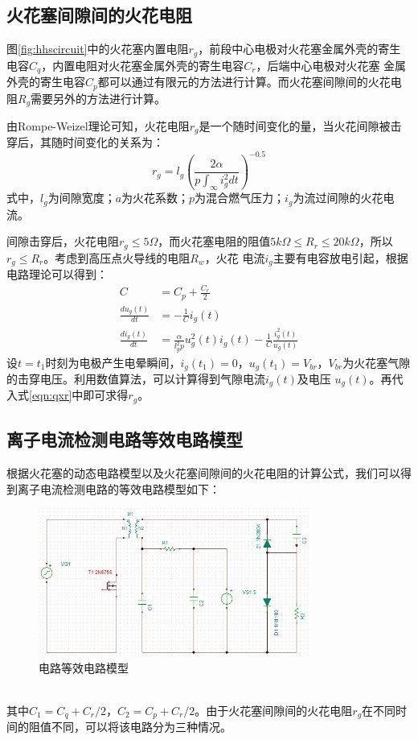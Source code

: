 \subsection{火花塞间隙间的火花电阻}
图\ref{fig:hhscircuit}中的火花塞内置电阻$r_{g}$，前段中心电极对火花塞金属外壳的寄生电容$C_{q}$，内置电阻对火花塞金属外壳的寄生电容$C_{r}$，后端中心电极对火花塞
金属外壳的寄生电容$C_{p}$都可以通过有限元的方法进行计算\cite{zyl2011}。而火花塞间隙间的火花电阻$R_{g}$需要另外的方法进行计算。
\par 由Rompe-Weizel理论可知，火花电阻$r_{g}$是一个随时间变化的量，当火花间隙被击穿后，其随时间变化的关系为：
\begin{equation}
	\label{eqn:qxr}
	r_{g}=l_{g}(\frac{2\alpha}{p\int_{\infty}i_{g}^{2}dt})^{-0.5}
\end{equation}
式中，$l_{g}$为间隙宽度；$a$为火花系数；$p$为混合燃气压力；$i_{g}$为流过间隙的火花电流。
\par 间隙击穿后，火花电阻$r_{g}\leq5\Omega$，而火花塞电阻的阻值$5k\Omega\leq R_{r}\leq 20k\Omega$，所以$r_{g}\leq R_{r}$。考虑到高压点火导线的电阻$R_{w}$，火花
电流$i_{g}$主要有电容放电引起，根据电路理论可以得到：
\begin{align}
C &= C_{p}+\frac{C_{r}}{2}\\
\frac{du_{g}(t)}{dt}&=-\frac{1}{C}i_{g}(t)\\
\frac{di_{g}(t)}{dt}&=\frac{\alpha}{l_{g}^{2}p}u_{g}^{2}(t)i_{g}(t)-\frac{1}{C}\frac{i_{g}^{2}(t)}{u_{g}(t)}
\end{align}
设$t=t_{1}$时刻为电极产生电晕瞬间，$i_{g}(t_{1})=0$，$u_{g}(t_{1})=V_{br}$，$V_{br}$为火花塞气隙的击穿电压。利用数值算法，可以计算得到气隙电流$i_{g}(t)$及电压
$u_{g}(t)$。再代入式\ref{eqn:qxr}中即可求得$r_{g}$。
\subsection{离子电流检测电路等效电路模型}
根据火花塞的动态电路模型以及火花塞间隙间的火花电阻的计算公式，我们可以得到离子电流检测电路的等效电路模型如下：
\begin{figure}[!h]
	\centering
	\includegraphics[width=0.8\textwidth]{thesis_figure/cmp_circuit}
	\caption{电路等效电路模型}
	\label{fig:cmp_circuit}
\end{figure}
\\其中$C_{1}=C_{q}+C_{r}/2$，$C_{2}=C_{p}+C_{r}/2$。由于火花塞间隙间的火花电阻$r_{g}$在不同时间的阻值不同，可以将该电路分为三种情况。
